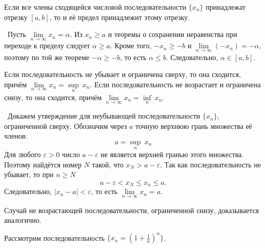\begin{theorem}
    Если все члены сходящейся числовой последовательности \(\{x_{n}\}\)
    принадлежат отрезку \([a,b]\), то и её предел принадлежит этому
    отрезку.

    \vspace{2mm}

    \proofname~Пусть \(\lim\limits_{n\to\infty}x_{n}=\alpha\). Из \(x_{n}\geq a\) и
    теоремы о сохранении неравенства при переходе к пределу следует
    \(\alpha\geq a\). Кроме того, \(-x_{n}\geq-b\) и
    \(\lim\limits_{n\to\infty}(-x_{n})=-\alpha\), поэтому по той же теореме \(-\alpha\geq-b\),
    то есть \(\alpha\leq b\). Следовательно, \(\alpha\in[a,b]\).~\qedsymbol
\end{theorem}


\begin{theorem}
    Если последовательность не убывает и ограничена сверху, то она
    сходится, причём \(\lim\limits_{ n \to \infty }{x_{n}} = \underset{n}{\sup}~x_{n}\). 
    Если последовательность не возрастает и ограничена снизу, то
    она сходится, причём \(\lim\limits_{ n \to \infty }{x_{n}} = \underset{n}{\inf}~x_{n}.\)

    \vspace{2mm}

    \proofname~Докажем утверждение для неубывающей последовательности
    \(\{x_{n}\}\), ограниченной сверху. Обозначим через \(a\) точную
    верхнюю грань множества её членов:
    \[a=\underset{n}{\sup}~x_{n}\]
    Для любого \(\varepsilon>0\) число \(a-\varepsilon\) не является
    верхней гранью этого множества. Поэтому найдётся номер \(N\) такой,
    что \(x_{N}>a-\varepsilon\). Так как последовательность не убывает,
    то при \(n\geq N\)
    \[a-\varepsilon<x_{N}\leq x_{n}\leq a.\]
    Следовательно, \(|x_{n}-a|<\varepsilon\), то есть
    \(\lim\limits_{n\to\infty}x_{n}=a\).

    Случай не возрастающей последовательности, ограниченной снизу,
    доказывается аналогично.~\qedsymbol
\end{theorem}


Рассмотрим последовательность
\(\{x_{n}=\left(1+\frac{1}{n}\right)^{n}\}\).

